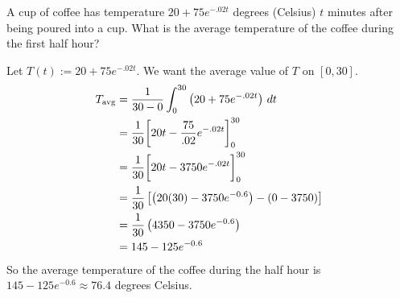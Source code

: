 \documentclass[nooutcomes]{ximera}
\begin{document}
\begin{problem}

      A cup of coffee has temperature $20 + 75e^{-.02t}$ degrees (Celsius) $t$ minutes after being poured into a cup.  
      What is the average temperature of the coffee during the first half hour?
      \begin{freeResponse}
        Let $T(t) := 20 + 75e^{-.02t}$.  We want the average value of $T$ on $[0,30]$.
        \begin{align*}
          T_{\text{avg}} &= \frac{1}{30-0} \int_0^{30} \left( 20 + 75e^{-.02t} \right) \,d t  \\
                         &= \frac{1}{30} \bigg[ 20t - \frac{75}{.02} e^{-.02t} \bigg]_0^{30}  \\
                         &= \frac{1}{30} \bigg[ 20t - 3750 e^{-.02t} \bigg]_0^{30}  \\
                         &= \frac{1}{30} \left[ \left( 20(30) - 3750e^{-0.6} \right) - (0 - 3750) \right]  \\
                         &= \frac{1}{30} \left( 4350 - 3750e^{-0.6} \right)  \\
                         &= 145 - 125e^{-0.6} 
        \end{align*}
        So the average temperature of the coffee during the half hour is $145 - 125e^{-0.6} \approx 76.4$ degrees Celsius.
      \end{freeResponse}
    

\end{problem}
\end{document}
